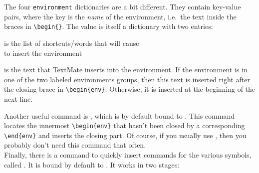 \documentclass[11pt, x11names]{article}
\begin{document}
The four \texttt{environment} dictionaries are a bit different. They contain key-value pairs, where the key is the \emph{name} of the environment, i.e.~the text inside the braces in \texttt{\textbackslash{}begin\{\}}. The value is itself a dictionary with two entries:

\begin{description}[style=multiline, leftmargin=1.8cm]

    \item[\texttt{triggers}] is the list of shortcuts/words that will cause\\  to insert the environment

    \item[\texttt{content}] is the text that TextMate inserts into the environment. If the environment is in one of the two labeled environments groups, then this text is inserted right after the closing brace in \texttt{\textbackslash{}begin\{env\}}. Otherwise, it is inserted at the beginning of the next line.

\end{description}

Another useful command is , which is by default bound to . This command locates the innermost \texttt{\textbackslash{}begin\{env\}} that hasn't been closed by a corresponding \texttt{\textbackslash{}end\{env\}} and inserts the closing part. Of course, if you usually use , then you probably don't need this command that often.\\

Finally, there is a command to quickly insert commands for the various symbols, called . It is bound by default to \keys{\cmd + \textbackslash{}}. It works in two stages:
\end{document}
